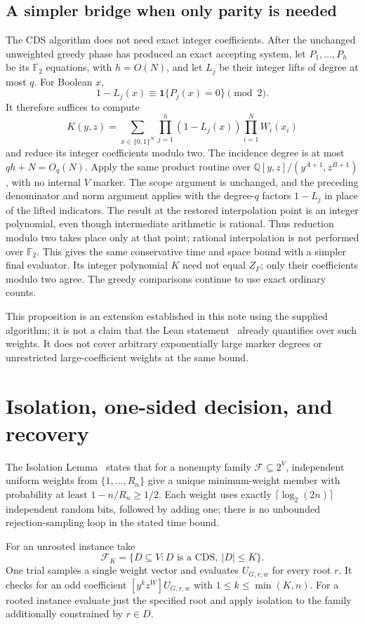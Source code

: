 \documentclass[11pt]{article}
\theoremstyle{remark}\newtheorem{remark}[theorem]{Remark}
\newcommand{\ind}[1]{\mathbf 1\{#1\}}
\begin{document}
\subsection{A simpler bridge when only parity is needed}
The CDS algorithm does not need exact integer coefficients. After the
unchanged unweighted greedy phase has produced an exact accepting system,
let $P_1,\ldots,P_h$ be its $\mathbb F_2$ equations, with $h=O(N)$,
and let $L_j$ be their integer lifts of degree at most $q$. For Boolean
$x$,
\[
 1-L_j(x)\equiv\ind{P_j(x)=0}\pmod2.
\]
It therefore suffices to compute
\[
 K(y,z)=\sum_{x\in\{0,1\}^N}
 \prod_{j=1}^h(1-L_j(x))\prod_{i=1}^N W_i(x_i)
\]
and reduce its integer coefficients modulo two. The incidence degree is
at most $qh+N=O_q(N)$. Apply the same product routine over
$\mathbb Q[y,z]/(y^{A+1},z^{B+1})$, with no internal $V$ marker.
The scope argument is unchanged, and the preceding denominator and
norm argument applies with the degree-$q$ factors $1-L_j$ in place of
the lifted indicators. The result at the restored interpolation point
is an integer polynomial, even though intermediate arithmetic is rational.
Thus reduction modulo two takes place only at that point; rational
interpolation is not performed over $\mathbb F_2$.
This gives the same conservative time and space bound with a simpler
final evaluator. Its integer polynomial $K$ need not equal $Z_F$;
only their coefficients modulo two agree. The greedy comparisons
continue to use exact ordinary counts.

This proposition is an extension established in this note using the
supplied algorithm; it is not a claim that the Lean statement~\cite{scope}
already quantifies over such weights. It does not cover arbitrary
exponentially large marker degrees or unrestricted large-coefficient
weights at the same bound.

\section{Isolation, one-sided decision, and recovery}\label{sec:algorithm}
The Isolation Lemma~\cite{isolation,cutcount} states that for a nonempty
family $\mathcal F\subseteq2^V$, independent uniform weights from
$\{1,\ldots,R_n\}$ give a unique minimum-weight member with probability
at least $1-n/R_n\ge1/2$. Each weight uses exactly
$\lceil\log_2(2n)\rceil$ independent random bits, followed by adding one;
there is no unbounded rejection-sampling loop in the stated time bound.

For an unrooted instance take
\[
 \mathcal F_K=\{D\subseteq V:D\text{ is a CDS},\ |D|\le K\}.
\]
One trial samples a single weight vector and evaluates
$U_{G,r,w}$ for every root $r$. It checks for an odd coefficient
$[y^kz^W]U_{G,r,w}$ with $1\le k\le\min(K,n)$.
For a rooted instance evaluate just the specified root and apply
isolation to the family additionally constrained by $r\in D$.
\end{document}
